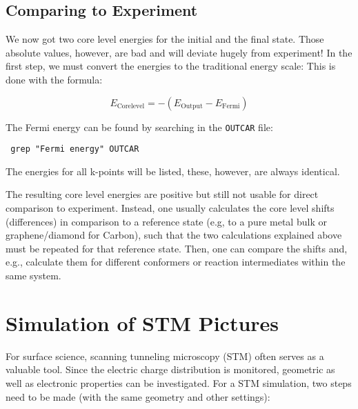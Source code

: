 \documentclass[a4paper,11pt]{article}
\begin{document}
\subsection{Comparing to Experiment}

We now got two core level energies for the initial and the final state.
Those absolute values, however, are bad and will deviate hugely from experiment!
In the first step, we must convert the energies to the traditional energy scale:
This is done with the formula:

\begin{equation*}
 E_{\text{Corelevel}} = -(E_{\text{Output}}-E_{\text{Fermi}})
\end{equation*}

The Fermi energy can be found by searching in the \texttt{OUTCAR} file:

\begin{verbatim}
 grep "Fermi energy" OUTCAR
\end{verbatim}

The energies for all k-points will be listed, these, however, are always identical.

The resulting core level energies are positive but still not usable for direct comparison
to experiment.
Instead, one usually calculates the core level shifts (differences) in comparison 
to a reference state 
(e.g, to a pure metal bulk or graphene/diamond for Carbon), such that the 
two calculations explained above must be repeated for that reference state.
Then, one can compare the shifts and, e.g., calculate them for different conformers 
or reaction intermediates within the same system.

\section{Simulation of STM Pictures}

For surface science, scanning tunneling microscopy (STM) often serves as a valuable tool. 
Since the electric charge
distribution is monitored, geometric as well as electronic properties can be investigated.
For a STM simulation, two steps need to be made (with the same geometry and other settings):
\end{document}
